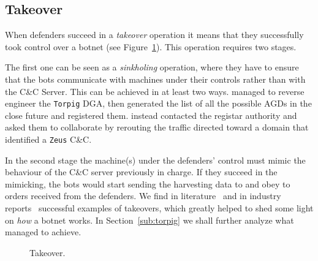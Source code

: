 \subsection{Takeover} %
\label{sub:takeover}
When defenders succeed in a \emph{takeover} operation it means that they successfully
took control over a botnet (see Figure~\ref{fig:takeover}). This operation requires two stages.

The first one can be seen as a \emph{sinkholing} operation, where they have to ensure
that the bots communicate with machines under their controls rather than with the
C\&C Server.
This can be achieved in at least two ways. \citet{gross2009} managed to reverse
engineer the \texttt{Torpig} DGA, then generated the list of all the possible
AGDs in the close future and registered them. \citet{micro2011} instead contacted
the registar authority and asked them to collaborate by rerouting the traffic
directed toward a domain that identified a \texttt{Zeus} C\&C.

In the second stage the machine(s) under the defenders' control must mimic the
behaviour of the C\&C server previously in charge. If they succeed in the
mimicking, the bots would start sending the harvesting data to and obey to orders
received from the defenders. We find in literature~\cite{gross2009} and
in industry reports~\cite{micro2011} successful examples of takeovers, which
greatly helped to shed some light on \emph{how} a botnet works. In Section~\ref{sub:torpig} we shall further analyze what~\citet{gross2009} managed to achieve.

\begin{figure}[!htp]
\centering
{}
\caption{Takeover.}
\label{fig:takeover}
\end{figure}


